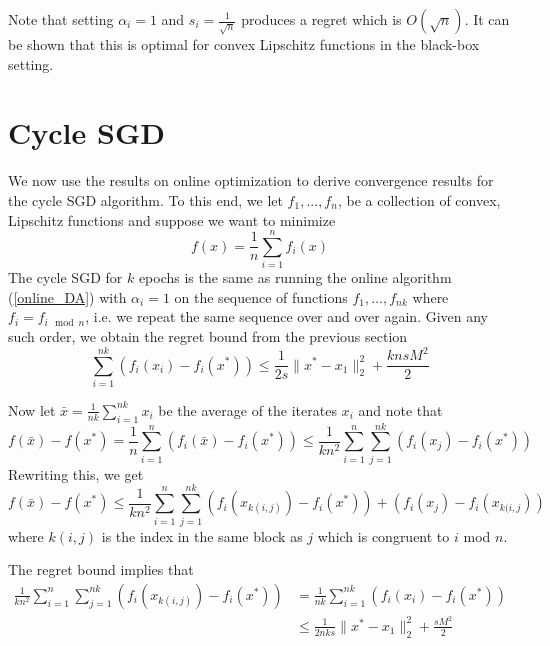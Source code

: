  Note that setting $\alpha_i = 1$ and $s_i = \frac{1}{\sqrt{n}}$ produces a regret which is $O(\sqrt{n})$. It can be
 shown that this is optimal for convex Lipschitz functions in the black-box setting.
\section{Cycle SGD}
We now use the results on online optimization to derive convergence results for the cycle SGD algorithm.
To this end, we let $f_1,...,f_n$, be a collection of convex, Lipschitz functions and suppose we want
to minimize
\begin{equation}
 f(x) = \frac{1}{n}\displaystyle\sum_{i = 1}^n f_i(x)
\end{equation}
The cycle SGD for $k$ epochs is the same as running the online algorithm (\ref{online_DA}) with $\alpha_i = 1$ on the sequence of
functions $f_1,...,f_{nk}$ where $f_i = f_{i\mod n}$, i.e. we repeat the same sequence over and over again. 
Given any such order, we obtain the regret bound from the previous section
\begin{equation}
 \displaystyle\sum_{i = 1}^{nk} (f_i(x_i) - f_i(x^*)) \leq \frac{1}{2s} \|x^* - x_1\|_2^2 + \frac{knsM^2}{2}
\end{equation}

Now let $\bar{x} = \frac{1}{nk}\displaystyle\sum_{i = 1}^{nk} x_i$ be the average of the iterates $x_i$ and note that
\begin{equation}
 f(\bar{x}) - f(x^*) = \frac{1}{n}\displaystyle\sum_{i = 1}^{n} (f_i(\bar{x}) - f_i(x^*)) 
 \leq \frac{1}{kn^2}\displaystyle\sum_{i = 1}^{n} \displaystyle\sum_{j = 1}^{nk} (f_i(x_j) - f_i(x^*))
\end{equation}
Rewriting this, we get
\begin{equation}
 f(\bar{x}) - f(x^*) \leq \frac{1}{kn^2}\displaystyle\sum_{i = 1}^{n} \displaystyle\sum_{j = 1}^{nk} (f_i(x_{k(i,j)}) - f_i(x^*)) + (f_i(x_j) - f_i(x_{k(i,j}))
\end{equation}
where $k(i,j)$ is the index in the same block as $j$ which is congruent to $i$ mod $n$.

The regret bound implies that
\begin{align}
 \frac{1}{kn^2}\displaystyle\sum_{i = 1}^{n} \displaystyle\sum_{j = 1}^{nk} (f_i(x_{k(i,j)}) - f_i(x^*)) 
 &= \frac{1}{nk}\displaystyle\sum_{i = 1}^{nk} (f_i(x_i) - f_i(x^*)) \\
 &\leq \frac{1}{2nks} \|x^* - x_1\|_2^2 + \frac{sM^2}{2}
\end{align}


